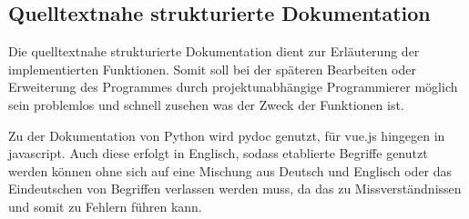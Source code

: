 \subsection{Quelltextnahe strukturierte Dokumentation}
Die quelltextnahe strukturierte Dokumentation dient zur Erläuterung der implementierten Funktionen. Somit soll bei der späteren Bearbeiten oder Erweiterung des Programmes durch projektunabhängige Programmierer möglich sein problemlos und schnell zusehen was der Zweck der Funktionen ist.

Zu der Dokumentation von Python wird pydoc genutzt, für vue.js hingegen in javascript. Auch diese erfolgt in Englisch, sodass etablierte Begriffe genutzt werden können ohne sich auf eine Mischung aus Deutsch und Englisch oder das Eindeutschen von Begriffen verlassen werden muss, da das zu Missverständnissen und somit zu Fehlern führen kann.